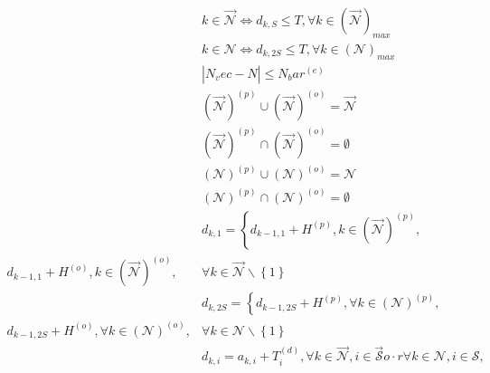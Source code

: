 \begin{align}
  & k \in \vec{\mathcal{N}} \Leftrightarrow d_{k , S} \leq T , \forall k \in \left(\vec{\mathcal{N}}\right)_{m a x} \tag{eq\_0001} \\
  & k \in {\mathcal{N}} \Leftrightarrow d_{k , 2 S} \leq T , \forall k \in \left({\mathcal{N}}\right)_{m a x} \tag{eq\_0002} \\
  & \left|\right. N_vec - {N} \left|\right. \leq N_bar^{\left(e\right)} \tag{eq\_0003} \\
  & \left(\vec{\mathcal{N}}\right)^{\left(p\right)} \cup \left(\vec{\mathcal{N}}\right)^{\left(o\right)} = \vec{\mathcal{N}} \tag{eq\_0004} \\
  & \left(\vec{\mathcal{N}}\right)^{\left(p\right)} \cap \left(\vec{\mathcal{N}}\right)^{\left(o\right)} = \emptyset \tag{eq\_0005} \\
  & \left({\mathcal{N}}\right)^{\left(p\right)} \cup \left({\mathcal{N}}\right)^{\left(o\right)} = {\mathcal{N}} \tag{eq\_0006} \\
  & \left({\mathcal{N}}\right)^{\left(p\right)} \cap \left({\mathcal{N}}\right)^{\left(o\right)} = \emptyset \tag{eq\_0007} \\
  & d_{k , 1} = \left\{\right. d_{k - 1 , 1} + H^{\left(p\right)} , k \in \left(\vec{\mathcal{N}}\right)^{\left(p\right)} , & \\ d_{k - 1 , 1} + H^{\left(o\right)} , k \in \left(\vec{\mathcal{N}}\right)^{\left(o\right)} , & \forall k \in \vec{\mathcal{N}} \backslash \left\{1\right\} \tag{eq\_0008} \\
  & d_{k , 2 S} = \left\{\right. d_{k - 1 , 2 S} + H^{\left(p\right)} , \forall k \in \left({\mathcal{N}}\right)^{\left(p\right)} , & \\ d_{k - 1 , 2 S} + H^{\left(o\right)} , \forall k \in \left({\mathcal{N}}\right)^{\left(o\right)} , & \forall k \in {\mathcal{N}} \backslash \left\{1\right\} \tag{eq\_0009} \\
  & d_{k , i} = a_{k , i} + T_{i}^{\left(d\right)} , \forall k \in \vec{\mathcal{N}} , i \in \vec{\mathcal{S}} o \cdot r \forall k \in {\mathcal{N}} , i \in {\mathcal{S}} , \tag{eq\_0010} \\

\end{align}
